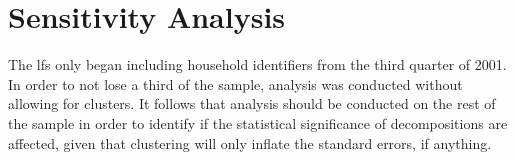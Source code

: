 \documentclass[class=article, crop=false]{standalone}
\begin{document}
\section{Sensitivity Analysis}
\label{sec:sensitivity}
The \acrshort{lfs} only began including household identifiers from the third quarter of 2001. In order to not lose a third of the sample, analysis was conducted without allowing for clusters. It follows that analysis should be conducted on the rest of the sample in order to identify if the statistical significance of decompositions are affected, given that clustering will only inflate the standard errors, if anything.

\ifstandalone

\fi
\end{document}
